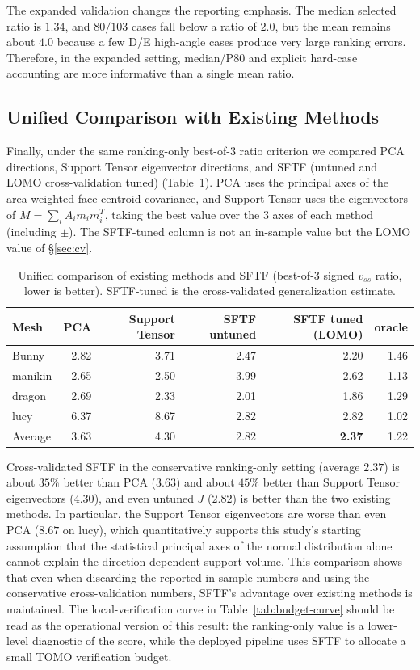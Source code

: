 \documentclass[11pt,a4paper]{article}
\begin{document}
The expanded validation changes the reporting emphasis.
The median selected ratio is $1.34$, and $80/103$ cases fall below a ratio of $2.0$, but the mean remains about $4.0$ because a few D/E high-angle cases produce very large ranking errors.
Therefore, in the expanded setting, median/P80 and explicit hard-case accounting are more informative than a single mean ratio.

\subsection{Unified Comparison with Existing Methods}
\label{sec:baseline}

Finally, under the same ranking-only best-of-3 ratio criterion we compared PCA directions, Support Tensor eigenvector directions,
and SFTF (untuned and LOMO cross-validation tuned) (Table~\ref{tab:unified}).
PCA
uses the principal axes of the area-weighted face-centroid covariance, and Support Tensor uses the eigenvectors of $M=\sum_i A_i m_i m_i^T$,
taking the best value over the 3 axes of each method (including $\pm$).
The SFTF-tuned column is not an in-sample value but the LOMO value of \S\ref{sec:cv}.

\begin{table}[H]
\centering
\caption{Unified comparison of existing methods and SFTF (best-of-3 signed $v_{ss}$ ratio, lower is better).
SFTF-tuned is the cross-validated generalization estimate.}
\label{tab:unified}
\begin{tabular}{lrrrrr}
\toprule
Mesh & PCA & Support Tensor & SFTF untuned & SFTF tuned (LOMO) & oracle\\
\midrule
Bunny    & 2.82 & 3.71 & 2.47 & 2.20 & 1.46\\
manikin  & 2.65 & 2.50 & 3.99 & 2.62 & 1.13\\
dragon   & 2.69 & 2.33 & 2.01 & 1.86 & 1.29\\
lucy     & 6.37 & 8.67 & 2.82 & 2.82 & 1.02\\
\midrule
Average     & 3.63 & 4.30 & 2.82 & \textbf{2.37} & 1.22\\
\bottomrule
\end{tabular}
\end{table}

Cross-validated SFTF in the conservative ranking-only setting (average $2.37$) is about $35\%$ better than PCA ($3.63$) and about $45\%$ better than Support Tensor eigenvectors ($4.30$),
and even untuned $J$ ($2.82$) is better than the two existing methods.
In particular, the Support Tensor eigenvectors are worse than even PCA ($8.67$ on lucy),
which quantitatively supports this study's starting assumption that the statistical principal axes of the normal distribution alone
cannot explain the direction-dependent support volume.
This comparison shows that even when discarding the reported in-sample numbers and using the conservative cross-validation numbers,
SFTF's advantage over existing methods is maintained.
The local-verification curve in Table~\ref{tab:budget-curve} should be read as the operational version of this result:
the ranking-only value is a lower-level diagnostic of the score, while the deployed pipeline uses SFTF to allocate a small TOMO verification budget.
\end{document}
